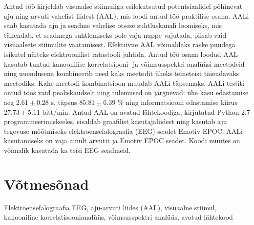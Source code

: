 Antud töö kirjeldab visuaalse stiimuliga esilekutsutud potentsiaalidel põhinevat aju ning arvuti vahelist liidest (AAL), mis loodi antud töö praktilise osana. AALi saab kasutada aju ja seadme vahelise otsese suhtluskanali loomiseks, mis tähendab, et seadmega suhtlemiseks pole vaja nuppe vajutada, piisab vaid visuaalsete stiimulite vaatamisest. Efektiivne AAL võimaldaks raske puudega isikutel näiteks elektroonilist ratastooli juhtida. Antud töö osana loodud AAL kasutab tuntud kanoonilise korrelatsiooni- ja võimsusspektri analüüsi meetodeid ning uuendusena kombineerib need kaks meetodit üheks teineteist täiendavaks meetodiks. Kahe meetodi kombinatsioon muudab AALi täpsemaks. AALi testiti antud töös vaid pealiskaudselt ning tulemused on järgnevad: ühe käsu edastamise aeg $2.61\pm 0.28$ s, täpsus $85.81\pm 6.39$ \% ning informatsiooni edastamise kiirus $27.73\pm 5.11$ bitt/min. Antud AAL on avatud lähtekoodiga, kirjutatud Python 2.7 programmeerimiskeeles, sisaldab graafilist kasutajaliidest ning kasutab aju tegevuse mõõtmiseks elektroensefalograafia (EEG) seadet Emotiv EPOC. AALi kasutamiseks on vaja ainult arvutit ja Emotiv EPOC seadet. Koodi muutes on võimalik kasutada ka teisi EEG seadmeid. 

\section*{Võtmesõnad}

Elektroensefalograafia \acrshort{EEG}, aju-arvuti liides (AAL), visuaalne stiimul, kanooniline korrelatisoonianalüüs, võimsusspektri analüüs, avatud lähtekood
